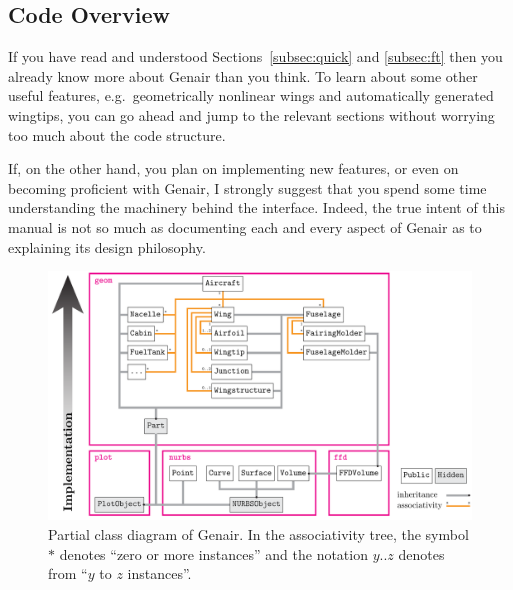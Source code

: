\documentclass[]{article}
\begin{document}
\subsection{Code Overview}

If you have read and understood Sections~\ref{subsec:quick} and 
\ref{subsec:ft} then you already know more about Genair than you think.  
To learn about some other useful features, e.g.\ geometrically nonlinear 
wings and automatically generated wingtips, you can go ahead and jump to 
the relevant sections without worrying too much about the code 
structure.

If, on the other hand, you plan on implementing new features, or even on 
becoming proficient with Genair, I strongly suggest that you spend some 
time understanding the machinery behind the interface.  Indeed, the true 
intent of this manual is not so much as documenting each and every 
aspect of Genair as to explaining its design philosophy.

\begin{figure}
  \includegraphics[width=\textwidth]{uml.pdf}
  \caption{%
Partial class diagram of Genair.  In the associativity tree, the symbol 
$\ast$ denotes ``zero or more instances'' and the notation $y..z$ 
denotes from ``$y$ to $z$ instances''.}
  \label{fig:uml}
\end{figure}
\end{document}
